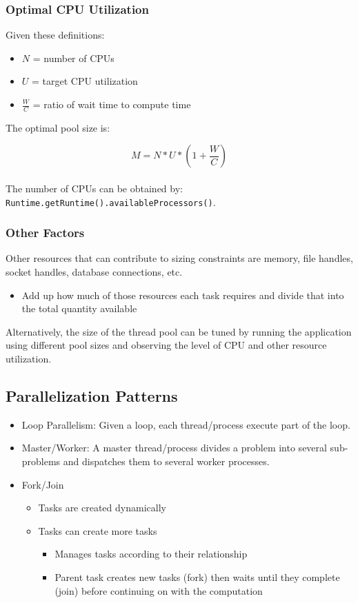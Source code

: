 \documentclass[a4paper]{article}
\begin{document}
\subsubsection{Optimal CPU Utilization}
Given these definitions:
\begin{itemize}
	\item $N$ = number of CPUs
	\item $U$ = target CPU utilization
	\item $\frac{W}{C}$ = ratio of wait time to compute time
\end{itemize}
The optimal pool size is:

$$M = N * U * \left(1 + \frac{W}{C}\right)$$
\\
\noindent The number of CPUs can be obtained by: \texttt{Runtime.getRuntime().availableProcessors()}.
\subsubsection{Other Factors}
Other resources that can contribute to sizing constraints are memory, file handles, socket handles, database connections, etc.
\begin{itemize}
	\item Add up how much of those resources each task requires and divide that into the total quantity available
\end{itemize}
Alternatively, the size of the thread pool can be tuned by running the application using different pool sizes and observing the level of CPU and other resource utilization.
\subsection{Parallelization Patterns}
\begin{itemize}
	\item Loop Parallelism: Given a loop, each thread/process execute part of the loop.
	\item Master/Worker: A master thread/process divides a problem into several sub-problems and dispatches them to several worker processes.
	\item Fork/Join
	\begin{itemize}[label=$\circ$]
		\item Tasks are created dynamically
		\item Tasks can create more tasks
		\begin{itemize}[label=\tiny$\blacksquare$]
			\item Manages tasks according to their relationship
			\item Parent task creates new tasks (fork) then waits until they complete (join) before continuing on with the computation
		\end{itemize}
	\end{itemize}
\end{itemize}
\end{document}
